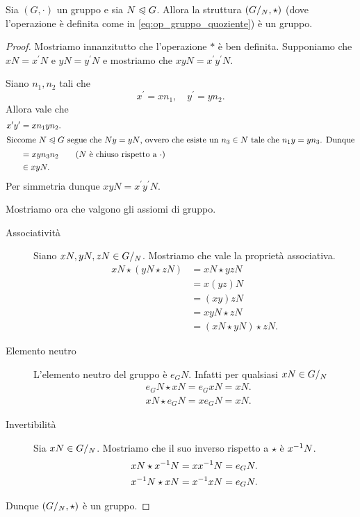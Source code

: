 \begin{proposition}
    Sia $(G, \cdot)$ un gruppo e sia $N \trianglelefteqslant G$. Allora la struttura $({G}/_{N}, \star)$ (dove l'operazione è definita come in \eqref{eq:op_gruppo_quoziente}) è un gruppo.
\end{proposition}
\begin{proof}
    Mostriamo innanzitutto che l'operazione $*$ è ben definita.
    Supponiamo che $xN = x^\prime N$ e $yN = y^\prime N$ e mostriamo che $xyN = x^\prime y^\prime N$.

    Siano $n_1, n_2$ tali che \[
        x^\prime = xn_1, \quad y^\prime = yn_2.    
    \] Allora vale che \begin{align*}
        x^\prime y^\prime &= xn_1 yn_2.\\
        \intertext{Siccome $N \trianglelefteqslant G$ segue che $Ny = yN$, ovvero che esiste un $n_3 \in N$ tale che $n_1y = yn_3$. Dunque}
        &= xy n_3n_2 \tag{$N$ è chiuso rispetto a $\cdot$}\\
        &\in xyN.
    \end{align*}
    Per simmetria dunque $xyN = x^\prime y^\prime N$.

    Mostriamo ora che valgono gli assiomi di gruppo.
    \begin{description}
        \item[Associatività] Siano $xN, yN, zN \in {G}/_{N}$. Mostriamo che vale la proprietà associativa.
        \begin{align*}
            xN \star (yN \star zN) &= xN \star yzN \\
            &= x(yz)N \tag{ass. in $G$}\\
            &= (xy)zN \\
            &= xyN \star zN \\
            &= (xN \star yN) \star zN.
        \end{align*}
        \item[Elemento neutro] L'elemento neutro del gruppo è $e_GN$. Infatti per qualsiasi $xN \in {G}/_{N}$ \begin{align*}
            &e_GN \star xN = e_GxN = xN.\\
            &xN \star e_GN = xe_GN = xN.
        \end{align*}
        \item[Invertibilità] Sia $xN \in {G}/_{N}$. Mostriamo che il suo inverso rispetto a $\star$ è $x^{-1} N$.
        \begin{align*}
            &xN \star x^{-1} N = xx^{-1} N = e_GN.\\
            &x^{-1} N \star xN = x^{-1} xN = e_GN.
        \end{align*} 
    \end{description}
    Dunque $({G}/_{N}, \star)$ è un gruppo.
\end{proof}

